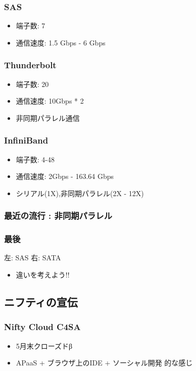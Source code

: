 \documentclass{jsarticle}
\begin{document}
\subsubsection{SAS}

\begin{itemize}
\item
  端子数: 7
\item
  通信速度: 1.5 Gbps - 6 Gbps
\end{itemize}
\subsubsection{Thunderbolt}

\begin{itemize}
\item
  端子数: 20
\item
  通信速度: 10Gbps * 2
\item
  非同期パラレル通信
\end{itemize}
\subsubsection{InfiniBand}

\begin{itemize}
\item
  端子数: 4-48
\item
  通信速度: 2Gbps - 163.64 Gbps
\item
  シリアル(1X),非同期パラレル(2X - 12X)
\end{itemize}
\subsubsection{最近の流行 : 非同期パラレル}

\subsubsection{最後}

左: SAS 右: SATA

\begin{itemize}
\item
  違いを考えよう!!
\end{itemize}
\subsection{ニフティの宣伝}

\subsubsection{Nifty Cloud C4SA}

\begin{itemize}
\item
  5月末クローズドβ
\item
  APaaS + ブラウザ上のIDE + ソーシャル開発 的な感じ
\end{itemize}
\end{document}

